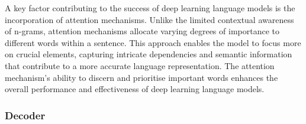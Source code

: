 A key factor contributing to the success of deep learning language models is the incorporation of attention mechanisms. Unlike the limited contextual awareness of n-grams, attention mechanisms allocate varying degrees of importance to different words within a sentence. This approach enables the model to focus more on crucial elements, capturing intricate dependencies and semantic information that contribute to a more accurate language representation. The attention mechanism's ability to discern and prioritise important words enhances the overall performance and effectiveness of deep learning language models.


\subsubsection{Decoder}%

